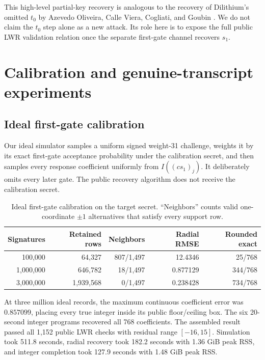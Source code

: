 \documentclass[11pt,a4paper]{article}
\begin{document}
This high-level partial-key recovery is analogous to the recovery of
Dilithium's omitted $t_0$ by Azevedo Oliveira, Calle Viera, Cogliati, and
Goubin \cite{Uncompressing}.  We do not claim the $t_0$ step alone as a new
attack.  Its role here is to expose the full public LWR validation relation
once the separate first-gate channel recovers $s_1$.

\section{Calibration and genuine-transcript experiments}
\label{sec:experiment}

\subsection{Ideal first-gate calibration}

Our ideal simulator samples a uniform signed weight-31 challenge, weights it
by its exact first-gate acceptance probability under the calibration secret,
and then samples every response coefficient uniformly from
$I((cs_1)_j)$.  It deliberately omits every later gate.  The public recovery
algorithm does not receive the calibration secret.

\begin{table}[ht]
\centering
\caption{Ideal first-gate calibration on the target secret.  ``Neighbors''
counts valid one-coordinate $\pm1$ alternatives that satisfy every support
row.}
\begin{tabular}{@{}rrrrr@{}}
\toprule
Signatures & Retained rows & Neighbors & Radial RMSE & Rounded exact\\
\midrule
100,000   & 64,327    & 807/1,497 & 12.4346  & 25/768\\
1,000,000 & 646,782   & 18/1,497  & 0.877129 & 344/768\\
3,000,000 & 1,939,568 & 0/1,497   & 0.238428 & 734/768\\
\bottomrule
\end{tabular}
\label{tab:ideal}
\end{table}

At three million ideal records, the maximum continuous coefficient error was
$0.857099$, placing every true integer inside its public floor/ceiling box.
The six 20-second integer programs recovered all 768 coefficients.  The
assembled result passed all 1,152 public LWR checks with residual range
$[-16,15]$.  Simulation took 511.8 seconds, radial recovery took 182.2 seconds
with 1.36 GiB peak RSS, and integer completion took 127.9 seconds with 1.48
GiB peak RSS.
\end{document}
